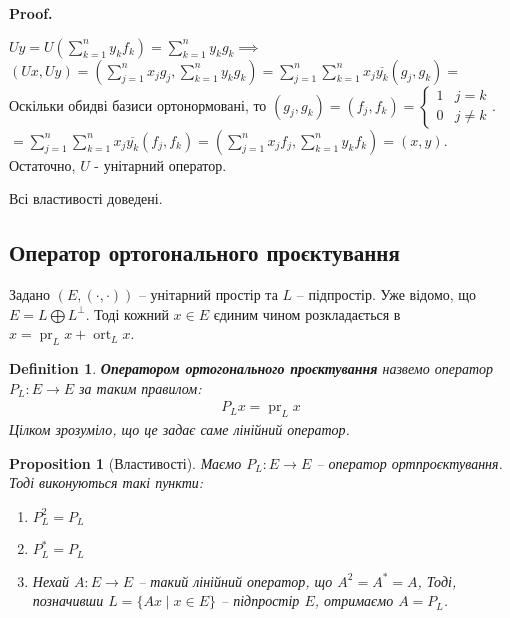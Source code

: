 \documentclass[a4paper, 10pt]{article}
\makeatletter
\theoremstyle{theoremdd}
\newtheorem{definition}[theorem]{Definition}
\newtheorem{proposition}[theorem]{Proposition}
\DeclareMathOperator{\ort}{ort}
\DeclareMathOperator{\pr}{pr}
\renewenvironment{proof}[1][Proof.\\]{\par
\pushQED{\hfill \qed}%
\normalfont \topsep6\p@\@plus6\p@\relax
\trivlist
\item\relax
{\bfseries
#1\@addpunct{.}}\hspace\labelsep\ignorespaces
}{%
\popQED\endtrivlist\@endpefalse
}
\makeatother
\begin{document}
\begin{proof}
\begin{enumerate}[topsep=-\parskip, wide=0pt, label={\arabic*)}]
\hspace{0.8cm}
$Uy = \displaystyle U\left(\sum_{k=1}^n y_k f_k \right) = \sum_{k=1}^n y_k g_k \implies$\\
$\displaystyle (Ux, Uy) = \left(\sum_{j=1}^n x_j g_j, \sum_{k=1}^n y_k g_k \right) = \sum_{j=1}^n \sum_{k=1}^n x_j \overline{y_k} (g_j,g_k) \boxed{=}$\\
Оскільки обидві базиси ортонормовані, то $(g_j,g_k) = (f_j,f_k) = \begin{cases} 1 & j = k \\ 0 & j \neq k \end{cases}$.\\
$\boxed{=} \displaystyle \sum_{j=1}^n \sum_{k=1}^n x_j \overline{y_k} (f_j,f_k) = \left(\sum_{j=1}^n x_jf_j, \sum_{k=1}^n y_k f_k \right) = (x,y)$.\\
Остаточно, $U$ - унітарний оператор.
\end{enumerate}
Всі властивості доведені.
\end{proof}

\subsection{Оператор ортогонального проєктування}
Задано $(E,(\cdot,\cdot))$ -- унітарний простір та $L$ -- підпростір. Уже відомо, що $E = L \bigoplus L^{\perp}$. Тоді кожний $x \in E$ єдиним чином розкладається в $x = \pr_L x + \ort_L x$.

\begin{definition}
\textbf{Оператором ортогонального проєктування} назвемо оператор $P_L \colon E \to E$ за таким правилом:
\begin{align*}
P_L x = \pr_L x
\end{align*}
Цілком зрозуміло, що це задає саме лінійний оператор.
\end{definition}

\begin{proposition}[Властивості]
Маємо $P_L \colon E \to E$ -- оператор ортпроєктування. Тоді виконуються такі пункти:
\begin{enumerate}[nosep,wide=0pt,label={\arabic*)}]
\item $P_L^2 = P_L$
\item $P^*_L = P_L$
\item Нехай $A \colon E \to E$ -- такий лінійний оператор, що $A^2 = A^* = A$, Тоді, позначивши $L = \{Ax \mid x \in E\}$ -- підпростір $E$, отримаємо $A = P_L$.
\end{enumerate}
\end{proposition}
\end{document}
